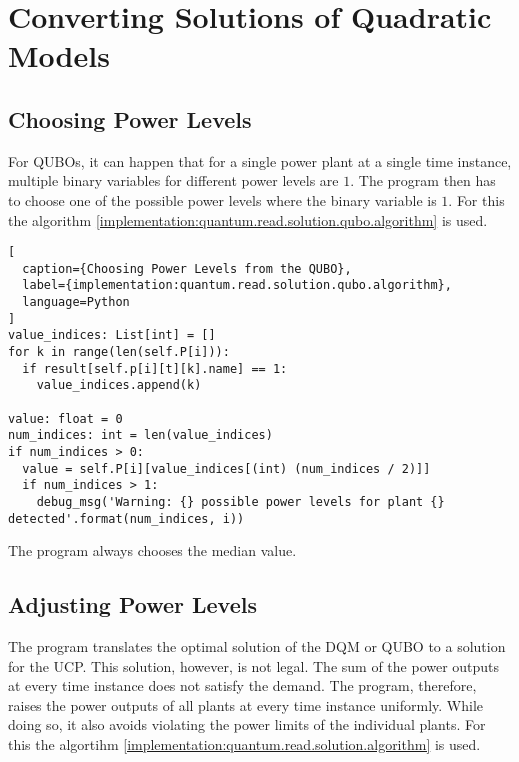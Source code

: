 \section{Converting Solutions of Quadratic Models}

\subsection{Choosing Power Levels}
\label{implementation:quantum.read.solution.qubo}

For QUBOs, it can happen that for a single power plant at a single time instance, multiple binary variables for different power levels are $1$.
The program then has to choose one of the possible power levels where the binary variable is $1$.
For this the algorithm \ref{implementation:quantum.read.solution.qubo.algorithm} is used.

\begin{lstlisting}[
  caption={Choosing Power Levels from the QUBO},
  label={implementation:quantum.read.solution.qubo.algorithm},
  language=Python
]
value_indices: List[int] = []
for k in range(len(self.P[i])):
  if result[self.p[i][t][k].name] == 1:
    value_indices.append(k)

value: float = 0
num_indices: int = len(value_indices)
if num_indices > 0:
  value = self.P[i][value_indices[(int) (num_indices / 2)]]
  if num_indices > 1:
    debug_msg('Warning: {} possible power levels for plant {} detected'.format(num_indices, i))
\end{lstlisting}

The program always chooses the median value.

\subsection{Adjusting Power Levels}
\label{implementation:quantum.read.solution}

The program translates the optimal solution of the DQM or QUBO to a solution for the UCP.
This solution, however, is not legal.
The sum of the power outputs at every time instance does not satisfy the demand.
The program, therefore, raises the power outputs of all plants at every time instance uniformly.
While doing so, it also avoids violating the power limits of the individual plants.
For this the algortihm \ref{implementation:quantum.read.solution.algorithm} is used.

